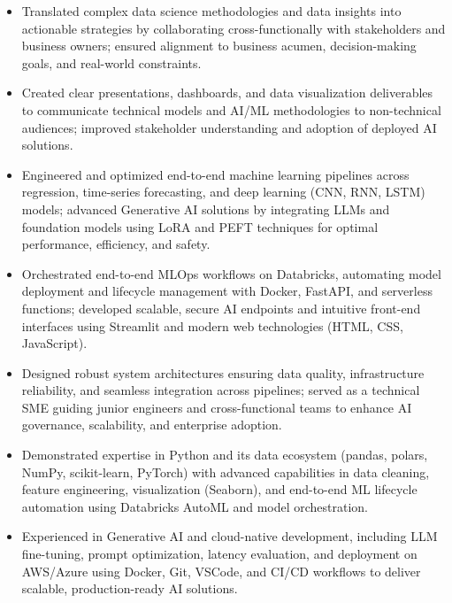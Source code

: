 \documentclass[11pt,letterpaper]{article}
\begin{document}
\begin{itemize}
  \item Translated complex data science methodologies and data insights into actionable strategies
        by collaborating cross-functionally with stakeholders and business owners; ensured alignment
        to business acumen, decision-making goals, and real-world constraints.

  \item Created clear presentations, dashboards, and data visualization deliverables to communicate
        technical models and AI/ML methodologies to non-technical audiences; improved stakeholder
        understanding and adoption of deployed AI solutions.

  \item Engineered and optimized end-to-end machine learning pipelines across regression,
        time-series forecasting, and deep learning (CNN, RNN, LSTM) models; advanced Generative AI
        solutions by integrating LLMs and foundation models using LoRA and PEFT techniques for
        optimal performance, efficiency, and safety.

  \item Orchestrated end-to-end MLOps workflows on Databricks, automating model deployment and
        lifecycle management with Docker, FastAPI, and serverless functions; developed scalable,
        secure AI endpoints and intuitive front-end interfaces using Streamlit and modern web
        technologies (HTML, CSS, JavaScript).

  \item Designed robust system architectures ensuring data quality, infrastructure reliability, and
        seamless integration across pipelines; served as a technical SME guiding junior engineers
        and cross-functional teams to enhance AI governance, scalability, and enterprise adoption.

  \item Demonstrated expertise in Python and its data ecosystem (pandas, polars, NumPy, scikit-learn,
        PyTorch) with advanced capabilities in data cleaning, feature engineering, visualization
        (Seaborn), and end-to-end ML lifecycle automation using Databricks AutoML and model
        orchestration.

  \item Experienced in Generative AI and cloud-native development, including LLM fine-tuning,
        prompt optimization, latency evaluation, and deployment on AWS/Azure using Docker, Git,
        VSCode, and CI/CD workflows to deliver scalable, production-ready AI solutions.


\end{itemize}
\end{document}
